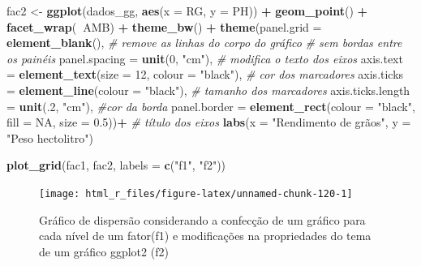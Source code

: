 \documentclass[
]{book}
\newenvironment{Shaded}{\begin{snugshade}}{\end{snugshade}}
\newcommand{\CommentTok}[1]{\textcolor[rgb]{0.56,0.35,0.01}{\textit{#1}}}
\newcommand{\DataTypeTok}[1]{\textcolor[rgb]{0.13,0.29,0.53}{#1}}
\newcommand{\DecValTok}[1]{\textcolor[rgb]{0.00,0.00,0.81}{#1}}
\newcommand{\FloatTok}[1]{\textcolor[rgb]{0.00,0.00,0.81}{#1}}
\newcommand{\KeywordTok}[1]{\textcolor[rgb]{0.13,0.29,0.53}{\textbf{#1}}}
\newcommand{\NormalTok}[1]{#1}
\newcommand{\OperatorTok}[1]{\textcolor[rgb]{0.81,0.36,0.00}{\textbf{#1}}}
\newcommand{\OtherTok}[1]{\textcolor[rgb]{0.56,0.35,0.01}{#1}}
\newcommand{\StringTok}[1]{\textcolor[rgb]{0.31,0.60,0.02}{#1}}
\begin{document}
\begin{Shaded}
\begin{Highlighting}[]
\NormalTok{fac2 <-}\StringTok{ }\KeywordTok{ggplot}\NormalTok{(dados_gg, }\KeywordTok{aes}\NormalTok{(}\DataTypeTok{x =}\NormalTok{ RG, }\DataTypeTok{y =}\NormalTok{ PH)) }\OperatorTok{+}
\StringTok{        }\KeywordTok{geom_point}\NormalTok{() }\OperatorTok{+}
\StringTok{        }\KeywordTok{facet_wrap}\NormalTok{(}\OperatorTok{~}\NormalTok{AMB) }\OperatorTok{+}
\StringTok{        }\KeywordTok{theme_bw}\NormalTok{() }\OperatorTok{+}
\StringTok{        }\KeywordTok{theme}\NormalTok{(}\DataTypeTok{panel.grid =} \KeywordTok{element_blank}\NormalTok{(), }\CommentTok{# remove as linhas do corpo do gráfico}
             \CommentTok{# sem bordas entre os painéis}
              \DataTypeTok{panel.spacing =} \KeywordTok{unit}\NormalTok{(}\DecValTok{0}\NormalTok{, }\StringTok{"cm"}\NormalTok{),}
             \CommentTok{# modifica o texto dos eixos}
              \DataTypeTok{axis.text =} \KeywordTok{element_text}\NormalTok{(}\DataTypeTok{size =} \DecValTok{12}\NormalTok{, }\DataTypeTok{colour =} \StringTok{"black"}\NormalTok{),}
             \CommentTok{# cor dos marcadores}
              \DataTypeTok{axis.ticks =} \KeywordTok{element_line}\NormalTok{(}\DataTypeTok{colour =} \StringTok{"black"}\NormalTok{),}
             \CommentTok{# tamanho dos marcadores}
              \DataTypeTok{axis.ticks.length =} \KeywordTok{unit}\NormalTok{(.}\DecValTok{2}\NormalTok{, }\StringTok{"cm"}\NormalTok{), }
             \CommentTok{#cor da borda}
              \DataTypeTok{panel.border =} \KeywordTok{element_rect}\NormalTok{(}\DataTypeTok{colour =} \StringTok{"black"}\NormalTok{, }\DataTypeTok{fill =} \OtherTok{NA}\NormalTok{, }\DataTypeTok{size =} \FloatTok{0.5}\NormalTok{))}\OperatorTok{+}
\StringTok{       }\CommentTok{# título dos eixos}
\StringTok{       }\KeywordTok{labs}\NormalTok{(}\DataTypeTok{x =} \StringTok{"Rendimento de grãos"}\NormalTok{, }\DataTypeTok{y =} \StringTok{"Peso hectolitro"}\NormalTok{) }

\KeywordTok{plot_grid}\NormalTok{(fac1, fac2, }\DataTypeTok{labels =} \KeywordTok{c}\NormalTok{(}\StringTok{"f1"}\NormalTok{, }\StringTok{"f2"}\NormalTok{))}
\end{Highlighting}
\end{Shaded}

\begin{figure}

{\centering \texttt{[image: html\_r\_files/figure-latex/unnamed-chunk-120-1]} 

}

\caption{Gráfico de dispersão considerando a confecção de um gráfico para cada nível de um fator(f1) e modificações na propriedades do tema de um gráfico ggplot2 (f2) }\label{fig:unnamed-chunk-120}
\end{figure}
\end{document}
